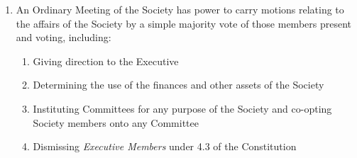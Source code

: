 \documentclass[11pt]{article}
\begin{document}
\begin{enumerate}[\thesection .1]
    \item An Ordinary Meeting of the Society has power to carry motions relating to the affairs of the Society by a simple majority vote of those members present and voting, including:
    \begin{enumerate}[\hspace{5mm}i.]
        \item Giving direction to the Executive
        \item Determining the use of the finances and other assets of the Society
        \item Instituting Committees for any purpose of the Society and co-opting Society members onto any Committee
        \item Dismissing \textit{Executive Members} under 4.3 of the Constitution
    \end{enumerate}
\end{enumerate}
\end{document}
